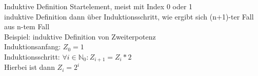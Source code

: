 \begin{frame}{Induktive Definition}
	Startelement, meist mit Index 0 oder 1\\
	induktive Definition dann über Induktionsschritt, wie ergibt sich (n+1)-ter Fall aus n-tem Fall\\
	Beispiel: induktive Definition von Zweiterpotenz\\
	Induktionsanfang: $Z_{0} = 1$\\
	Induktionsschritt: $\forall i\in \mathbb{N}_0 : Z_{i+1} = Z_{i} * 2$\\
	Hierbei ist dann $Z_{i} = 2^{i}$
\end{frame}
